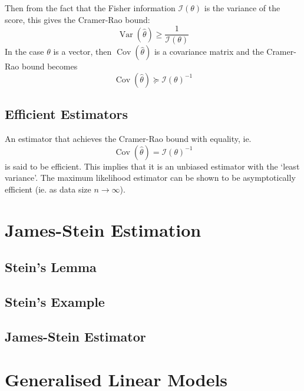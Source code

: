 \documentclass[11pt]{report} %
\begin{document}
Then from the fact that the Fisher information $\mathcal{I}\left(\theta\right)$ is the variance of the score, this gives the Cramer-Rao bound:
\begin{equation}
\operatorname{Var}\left(\hat{\theta}\right) \geq \dfrac{1}{\mathcal{I}\left(\theta\right)}
\end{equation}
In the case $\theta$ is a vector, then $\operatorname{Cov}\left(\hat{\theta}\right)$ is a covariance matrix and the Cramer-Rao bound becomes
\begin{equation}
\operatorname{Cov}\left(\hat{\theta}\right) \succeq \mathcal{I}\left(\theta\right)^{-1}
\end{equation}

\subsection{Efficient Estimators}

An estimator that achieves the Cramer-Rao bound with equality, ie.
\begin{equation}
\operatorname{Cov}\left(\hat{\theta}\right) = \mathcal{I}\left(\theta\right)^{-1}
\end{equation}
is said to be efficient. This implies that it is an unbiased estimator with the `least variance'. The maximum likelihood estimator can be shown to be asymptotically efficient (ie. as data size $n \to \infty$).

\section{James-Stein Estimation}

\subsection{Stein's Lemma}

\subsection{Stein's Example}

\subsection{James-Stein Estimator}

\section{Generalised Linear Models}
\end{document}
